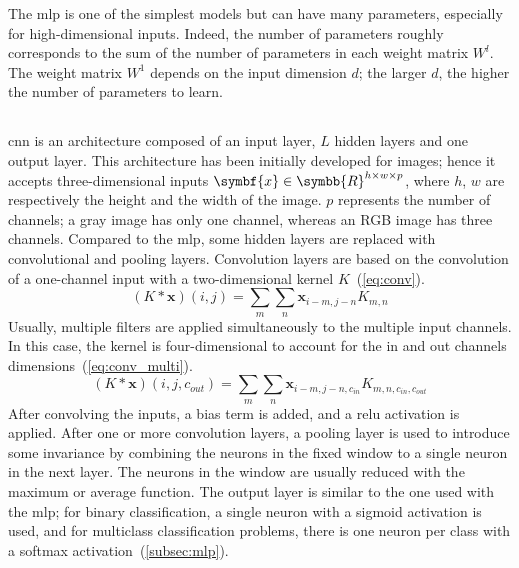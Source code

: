\documentclass[../main.tex]{subfiles}
\begin{document}
		The \gls{mlp} is one of the simplest models but can have many parameters, especially for high-dimensional inputs.
		Indeed, the number of parameters roughly corresponds to the sum of the number of parameters in each weight matrix \(W^{l}\).
		The weight matrix \(W^1\) depends on the input dimension \(d\); the larger \(d\), the higher the number of parameters to learn.

	\subsection{}
		\Gls{cnn} is an architecture composed of an input layer, \(L\) hidden layers and one output layer.
		This architecture has been initially developed for images; hence it accepts three-dimensional inputs \(\symbf{x} \in \symbb{R}^{h\times w \times p} \), where \(h\), \(w\) are respectively the height and the width of the image.
		\(p\) represents the number of channels; a gray image has only one channel, whereas an RGB image has three channels.
		Compared to the \gls{mlp}, some hidden layers are replaced with convolutional and pooling layers.
		Convolution layers are based on the convolution of a one-channel input with a two-dimensional kernel \(K\)~(\cref{eq:conv}).
		\begin{equation}
			\left(K * \symbf{x}\right)\left(i,j\right) =\sum_m\sum_n \symbf{x}_{i-m, j-n}K_{m,n} \label{eq:conv}
		\end{equation}
		Usually, multiple filters are applied simultaneously to the multiple input channels.
		In this case, the kernel is four-dimensional to account for the in and out channels dimensions~(\cref{eq:conv_multi}).
		\begin{equation}
			\left(K * \symbf{x}\right)\left(i,j, c_{out}\right) =\sum_m\sum_n \symbf{x}_{i-m, j-n, c_{in}}K_{m,n, c_{in}, c_{out}} \label{eq:conv_multi}
		\end{equation}
		After convolving the inputs, a bias term is added, and a \gls{relu} activation is applied.
		After one or more convolution layers, a pooling layer is used to introduce some invariance by combining the neurons in the fixed window to a single neuron in the next layer.
		The neurons in the window are usually reduced with the maximum or average function.
		The output layer is similar to the one used with the \gls{mlp}; for binary classification, a single neuron with a sigmoid activation is used, and for multiclass classification problems, there is one neuron per class with a softmax activation~(\cref{subsec:mlp}).
\end{document}
